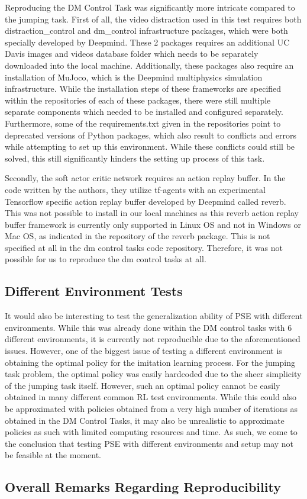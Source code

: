 \documentclass{usiinftr}
\begin{document}
Reproducing the DM Control Task was significantly more intricate compared to the jumping task. First of all, the video distraction used in this test requires both distraction\_control and dm\_control infrastructure packages, which were both specially developed by Deepmind. These 2 packages requires an additional UC Davis images and videos database folder which needs to be separately downloaded into the local machine. Additionally, these packages also require an installation of MuJoco, which is the Deepmind multiphysics simulation infrastructure. While the installation steps of these frameworks are specified within the repositories of each of these packages, there were still multiple separate components which needed to be installed and configured separately. Furthermore, some of the requirements.txt given in the repositories point to deprecated versions of Python packages, which also result to conflicts and errors while attempting to set up this environment. While these conflicts could still be solved, this still significantly hinders the setting up process of this task. 

Secondly, the soft actor critic network requires an action replay buffer. In the code written by the authors, they utilize tf-agents with an experimental Tensorflow specific action replay buffer developed by Deepmind called reverb. This was not possible to install in our local machines as this reverb action replay buffer framework is currently only supported in Linux OS and not in Windows or Mac OS, as indicated in the repository of the reverb package. This is not specified at all in the dm control tasks code repository. Therefore, it was not possible for us to reproduce the dm control tasks at all.  
\subsection{Different Environment Tests}
It would also be interesting to test the generalization ability of PSE with different environments. While this was already done within the DM control tasks with 6 different environments, it is currently not reproducible due to the aforementioned issues. However, one of the biggest issue of testing a different environment is obtaining the optimal policy for the imitation learning process. For the jumping task problem, the optimal policy was easily hardcoded due to the sheer simplicity of the jumping task itself. However, such an optimal policy cannot be easily obtained in many different common RL test environments. While this could also be approximated with policies obtained from a very high number of iterations as obtained in the DM Control Tasks, it may also be unrealistic to approximate policies as such with limited computing resources and time. As such, we come to the conclusion that testing PSE with different environments and setup may not be feasible at the moment. 
\subsection{Overall Remarks Regarding Reproducibility}


\end{document}
